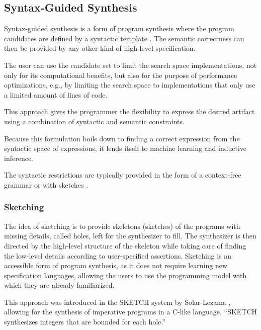 \subsection{Syntax-Guided Synthesis}
\label{sec:sygus}


Syntax-guided synthesis is a form of program synthesis where the program
candidates are defined by a syntactic template \cite{Alur:sygus:2013}.
The semantic correctness can then be provided by any other kind of high-level
specification.

The user can use the candidate set to limit the search space implementations,
not only for its computational benefits, but also for the purpose of performance
optimizations, e.g., by limiting the search space to implementations that only
use a limited amount of lines of code.

This approach gives the programmer the flexibility to express the desired
artifact using a combination of syntactic and semantic constraints.

Because this formulation boils down to finding a correct expression from
the syntactic space of expressions, it lends itself to machine learning and
inductive inference.

The syntactic restrictions are typically provided in the form of a context-free
grammar \cite{Alur:sygus:2013} or with sketches \cite{Solar-Lezama:2008}.

\subsubsection{Sketching}
\label{sec:sketching}


The idea of sketching is to provide skeletons (sketches) of the programs with
missing details, called holes, left for the synthesizer to fill.
The synthesizer is then directed by the high-level structure of the skeleton
while taking care of finding the low-level details according to user-specified
assertions.
Sketching is an accessible form of program synthesis, as it does not require
learning new specification languages, allowing the users to use the programming
model with which they are already familiarized.

This approach was introduced in the SKETCH system by Solar-Lezama
\cite{Solar-Lezama:2008}, allowing for the synthesis of imperative programs
in a C-like language. ``SKETCH synthesizes integers that are bounded for each
hole.''

